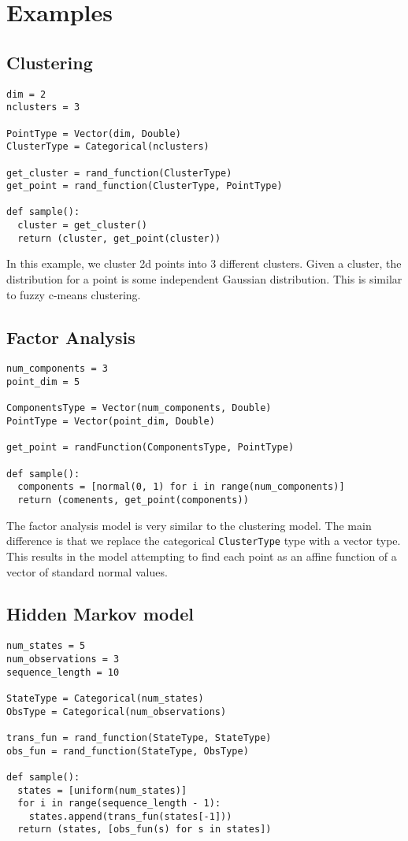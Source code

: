 \documentclass[proceed]{article}
\begin{document}
  \section{Examples}

  \subsection{Clustering}
\begin{verbatim}
dim = 2
nclusters = 3

PointType = Vector(dim, Double)
ClusterType = Categorical(nclusters)

get_cluster = rand_function(ClusterType)
get_point = rand_function(ClusterType, PointType)

def sample():
  cluster = get_cluster()
  return (cluster, get_point(cluster))
\end{verbatim}

In this example, we cluster 2d points into 3 different clusters.  Given a cluster, the distribution for a point is some independent Gaussian distribution.  This is similar to fuzzy c-means clustering.


  \subsection{Factor Analysis}

\begin{verbatim}
num_components = 3
point_dim = 5

ComponentsType = Vector(num_components, Double)
PointType = Vector(point_dim, Double)

get_point = randFunction(ComponentsType, PointType)

def sample():
  components = [normal(0, 1) for i in range(num_components)]
  return (comenents, get_point(components))
\end{verbatim}

The factor analysis model is very similar to the clustering model.  The main difference is that we replace the categorical \texttt{ClusterType} type with a vector type.  This results in the model attempting to find each point as an affine function of a vector of standard normal values.

  \subsection{Hidden Markov model}
\begin{verbatim}
num_states = 5
num_observations = 3
sequence_length = 10

StateType = Categorical(num_states)
ObsType = Categorical(num_observations)

trans_fun = rand_function(StateType, StateType)
obs_fun = rand_function(StateType, ObsType)

def sample():
  states = [uniform(num_states)]
  for i in range(sequence_length - 1):
    states.append(trans_fun(states[-1]))
  return (states, [obs_fun(s) for s in states])
\end{verbatim}
\end{document}
